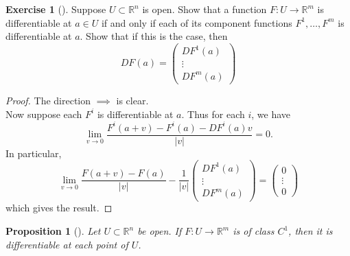 \documentclass[reqno]{amsart}
\theoremstyle{plain}%
\newtheorem{proposition}[theorem]{Proposition}
\theoremstyle{definition}
\newtheorem{exercise}[theorem]{Exercise}
\theoremstyle{remark}
\begin{document}
        \begin{exercise}[]
        Suppose $U \subset \mathbb{R}^{n}$ is open. Show that a function
        $F  \colon U \to \mathbb{R}^{m}$ is differentiable at $a \in U$ if and only
        if each of its component functions $F^{1},\ldots, F^{m}$ is differentiable
        at $a$. Show that if this is the case, then
        \[
        DF(a) = \begin{pmatrix} 
            DF^{1}(a)\\
            \vdots \\
            DF^{m}(a)
        \end{pmatrix} 
        \] 
        \end{exercise}


        \begin{proof}
        The direction $\implies$ is clear.\\
        Now suppose each $F^{i}$ is differentiable at $a$. Thus for each $i$, we
        have
        \[
        \lim_{v \to 0} \frac{F^{i}(a+v) - F^{i}(a) - DF^{i}(a) v}{\left| v \right|
        }=0.
        \] 
        In particular,
        \[
        \lim_{v \to 0} \frac{F(a+v) - F(a)}{\left| v \right| } -
        \frac{1}{\left| v \right| } \begin{pmatrix} 
            DF^{1}(a) \\
            \vdots \\
            DF^{m}(a)
        \end{pmatrix} = \begin{pmatrix} 
            0 \\
            \vdots \\
            0
        \end{pmatrix} 
        \] 
        which gives the result.
        \end{proof}




        \begin{proposition}[]
        Let $U \subset \mathbb{R}^{n}$ be open. If $F  \colon U \to \mathbb{R}^{m}$ 
        is of class $C^{1}$, then it is differentiable at each point of $U$.
        \end{proposition}
\end{document}
